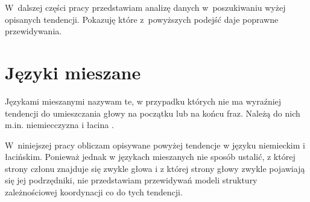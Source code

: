W~dalszej części pracy przedstawiam analizę danych w~poszukiwaniu wyżej opisanych tendencji. Pokazuję które z~powyższych podejść daje poprawne przewidywania.

\section{Języki mieszane}

Językami mieszanymi nazywam te, w przypadku których nie ma wyraźniej tendencji do umieszczania głowy na początku lub na końcu fraz. Należą do nich m.in. niemiecczyzna i łacina \citep{polinsky2020headedness}.

W~niniejszej pracy obliczam opisywane powyżej tendencje w języku niemieckim i łacińskim. Ponieważ jednak w językach mieszanych nie sposób ustalić, z której strony członu znajduje się zwykle głowa i z której strony głowy zwykle pojawiają się jej podrzędniki, nie przedstawiam przewidywań modeli struktury zależnościowej koordynacji co do tych tendencji. 
